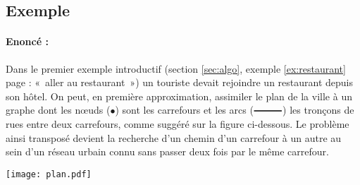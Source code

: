 \subsection{Exemple}

\paragraph{Enoncé :}
Dans le premier exemple introductif (section \ref{sec:algo}, exemple \ref{ex:restaurant} 
page \pageref{ex:restaurant} : «~aller au restaurant~»)
un touriste devait rejoindre un restaurant depuis son hôtel.
On peut, en première approximation, assimiler le plan de la ville à un graphe dont 
les n\oe uds ($\bullet$) sont les carrefours et les arcs ($\rule[0.5ex]{1cm}{1pt}$)
les tronçons de rues entre deux carrefours, comme suggéré sur la figure ci-dessous. 
Le problème ainsi transposé devient la recherche d'un chemin d'un carrefour à un autre
au sein d'un réseau urbain connu sans passer deux fois par le même carrefour.
\vspace*{3mm}


\noindent\begin{minipage}{7cm}
\texttt{[image: plan.pdf]}
\end{minipage}
\hfill
\begin{minipage}{7cm}
\end{minipage}
\vspace*{3mm}


